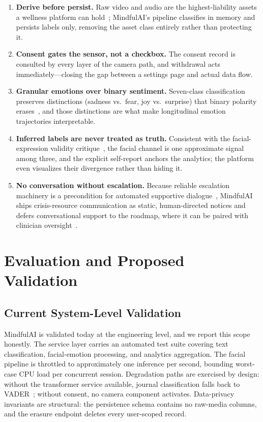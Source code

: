 \documentclass[11pt,a4paper]{article}
\newcommand{\system}{MindfulAI}
\begin{document}
\begin{enumerate}[leftmargin=2em, itemsep=3pt]
    \item \textbf{Derive before persist.} Raw video and audio are the highest-liability assets a wellness platform can hold~\cite{lagan2020}; \system{}'s pipeline classifies in memory and persists labels only, removing the asset class entirely rather than protecting it.
    \item \textbf{Consent gates the sensor, not a checkbox.} The consent record is consulted by every layer of the camera path, and withdrawal acts immediately---closing the gap between a settings page and actual data flow.
    \item \textbf{Granular emotions over binary sentiment.} Seven-class classification preserves distinctions (sadness vs.\ fear, joy vs.\ surprise) that binary polarity erases~\cite{demszky2020,hartmann2023}, and those distinctions are what make longitudinal emotion trajectories interpretable.
    \item \textbf{Inferred labels are never treated as truth.} Consistent with the facial-expression validity critique~\cite{barrett2019}, the facial channel is one approximate signal among three, and the explicit self-report anchors the analytics; the platform even visualizes their divergence rather than hiding it.
    \item \textbf{No conversation without escalation.} Because reliable escalation machinery is a precondition for automated supportive dialogue~\cite{abdalrazaq2020}, \system{} ships crisis-resource communication as static, human-directed notices and defers conversational support to the roadmap, where it can be paired with clinician oversight~\cite{ayers2023}.
\end{enumerate}

\section{Evaluation and Proposed Validation}\label{sec:eval}

\subsection{Current System-Level Validation}

\system{} is validated today at the engineering level, and we report this scope honestly. The service layer carries an automated test suite covering text classification, facial-emotion processing, and analytics aggregation. The facial pipeline is throttled to approximately one inference per second, bounding worst-case CPU load per concurrent session. Degradation paths are exercised by design: without the transformer service available, journal classification falls back to VADER~\cite{hutto2014}; without consent, no camera component activates. Data-privacy invariants are structural: the persistence schema contains no raw-media columns, and the erasure endpoint deletes every user-scoped record.
\end{document}
